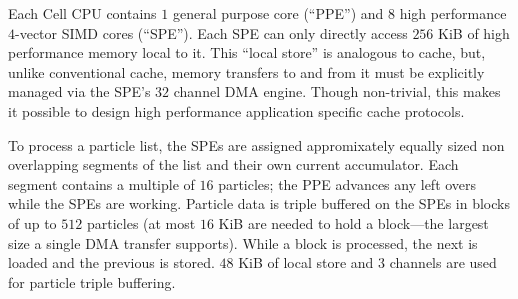 \documentclass[letter,10pt]{article}
\begin{document}




Each Cell CPU contains $1$ general purpose core (``PPE'') and $8$ high
performance $4$-vector SIMD cores (``SPE'').  Each SPE can only
directly access $256$ KiB of high performance memory local to it.
This ``local store'' is analogous to cache, but, unlike conventional
cache, memory transfers to and from it must be explicitly managed via
the SPE's $32$ channel DMA engine.  Though non-trivial, this makes it
possible to design high performance application specific cache
protocols. %

To process a particle list, the SPEs are assigned appromixately equally
sized non overlapping segments of the list and their own
current accumulator.  Each segment contains a
multiple of $16$ particles; the PPE advances any left overs while the
SPEs are working.  Particle data is triple buffered on the SPEs in
blocks of up to $512$ particles (at most $16$ KiB are needed to hold a
block---the largest size a single DMA transfer supports).
While a block is processed, the next is loaded and the previous is
stored.  $48$ KiB of local store and $3$ channels are used for particle
triple buffering.
\end{document}

